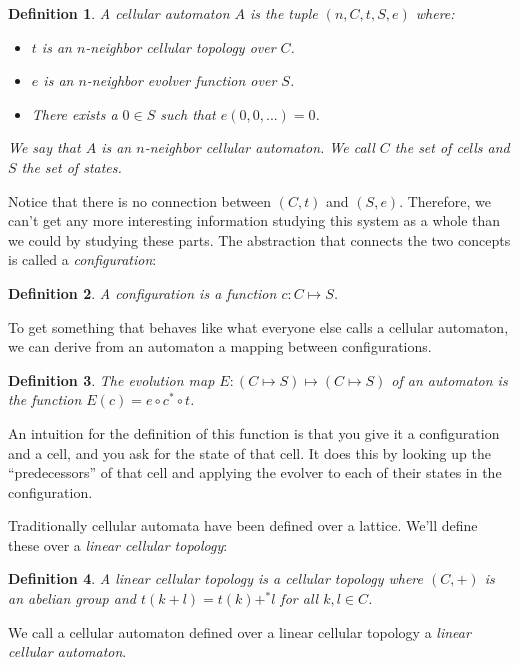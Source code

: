 \documentclass[12pt]{article}
\newtheorem*{Definition}{Definition}
\begin{document}
\begin{Definition}
A cellular automaton $A$ is the tuple $(n,C,t,S,e)$ where:
\begin{itemize}
\item $t$ is an $n$-neighbor cellular topology over $C$.
\item $e$ is an $n$-neighbor evolver function over $S$.
\item There exists a $0 \in S$ such that $e(0,0,...) = 0$.
\end{itemize}
We say that $A$ is an $n$-neighbor cellular automaton.  We call $C$ the
set of cells and $S$ the set of states.
\end{Definition}

Notice that there is no connection between $(C,t)$ and $(S,e)$.
Therefore, we can't get any more interesting information studying this
system as a whole than we could by studying these parts.  The
abstraction that connects the two concepts is called a
\textit{configuration}:

\begin{Definition}
A configuration is a function $c: C \mapsto S$.
\end{Definition}

To get something that behaves like what everyone else calls a cellular
automaton, we can derive from an automaton a mapping between
configurations.

\begin{Definition}
The evolution map $E: (C \mapsto S) \mapsto (C \mapsto S)$ of an
automaton is the function $E(c) = e \circ c^* \circ t$.
\end{Definition}

An intuition for the definition of this function is that you give it a
configuration and a cell, and you ask for the state of that cell.  It
does this by looking up the ``predecessors'' of that cell and applying
the evolver to each of their states in the configuration.

Traditionally cellular automata have been defined over a lattice.  We'll
define these over a \textit{linear cellular topology}:

\begin{Definition}
A linear cellular topology is a cellular topology where $(C,+)$ is an
abelian group and $t(k+l) = t(k) +^* l$ for all $k,l \in C$.
\end{Definition}

We call a cellular automaton defined over a linear cellular topology
a \textit{linear cellular automaton}.
\end{document}
